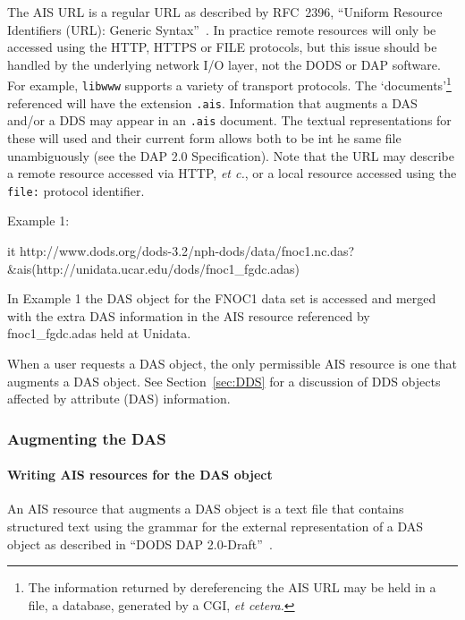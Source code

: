 \documentclass{article}
\begin{document}
The \ac{AIS} \ac{URL} is a regular \ac{URL} as described by RFC~2396,
``Uniform Resource Identifiers (URL): Generic Syntax''~\cite{rfc2396}.
\cbstart In practice remote resources will only be accessed using the
\ac{HTTP}, HTTPS or FILE protocols, but this issue should be handled by the
underlying network I/O layer, not the \ac{DODS} or \ac{DAP} software. For
example, \texttt{libwww} supports a variety of transport protocols. The
`documents'\footnote{The information returned by dereferencing the AIS URL
  may be held in a file, a database, generated by a CGI, \emph{et cetera.}}
referenced will have the extension \texttt{.ais}. Information that augments a
DAS and/or a DDS may appear in an \texttt{.ais} document. The textual
representations for these will used and their current form allows both to be
int he same file unambiguously (see the DAP 2.0 Specification). Note that the
URL may describe a remote resource accessed via HTTP, \emph{et c.}, or a
local resource accessed using the \texttt{file:} protocol identifier. \cbend

Example 1:\\
\begin{vcode}{it}
http://www.dods.org/dods-3.2/nph-dods/data/fnoc1.nc.das?
    &ais(http://unidata.ucar.edu/dods/fnoc1_fgdc.adas)
\end{vcode}

In Example 1 the DAS object for the FNOC1 data set is accessed and merged
with the extra DAS information in the \ac{AIS} resource referenced by
fnoc1\_fgdc.adas held at Unidata.

When a user requests a DAS object, the only permissible \ac{AIS} resource is
one that augments a DAS object. See Section~\ref{sec:DDS} for a discussion of
DDS objects affected by attribute (DAS) information.

\subsubsection{Augmenting the DAS}
\label{sec:DAS}

\paragraph{Writing \ac{AIS} resources for the \ac{DAS} object}
An \ac{AIS} resource that augments a \ac{DAS} object is a text file that
contains structured text using the grammar for the external representation of
a \ac{DAS} object as described in ``DODS DAP
2.0-Draft''~\cite{gallagher:dap-spec}. 
\end{document}
